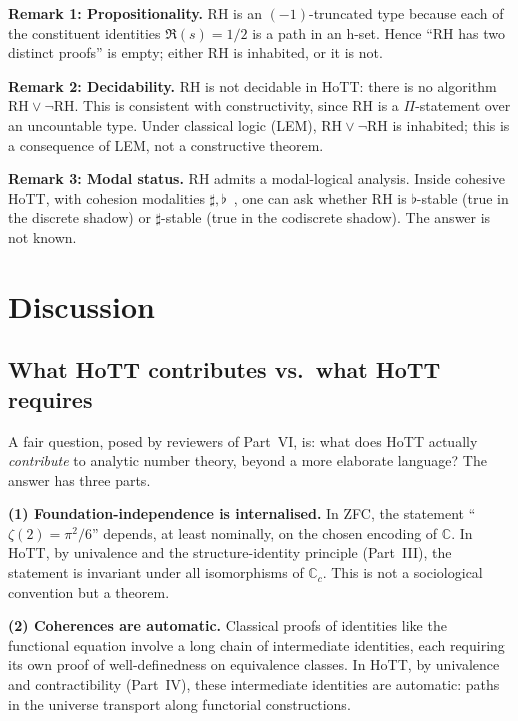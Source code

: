 \documentclass[12pt]{article}
\theoremstyle{definition}
\theoremstyle{remark}
\newcommand{\C}{\mathbb{C}}
\newcommand{\Cc}{\C_{c}}
\begin{document}
\textbf{Remark 1: Propositionality.} $\mathrm{RH}$ is an
$(-1)$-truncated type because each of the constituent identities
$\Re(s) = 1/2$ is a path in an h-set. Hence ``$\mathrm{RH}$ has two
distinct proofs'' is empty; either $\mathrm{RH}$ is inhabited, or it
is not.

\textbf{Remark 2: Decidability.} $\mathrm{RH}$ is not decidable in
HoTT: there is no algorithm $\mathrm{RH} \vee \neg \mathrm{RH}$. This
is consistent with constructivity, since $\mathrm{RH}$ is a
$\Pi$-statement over an uncountable type. Under classical logic
(LEM), $\mathrm{RH} \vee \neg \mathrm{RH}$ is inhabited; this is a
consequence of LEM, not a constructive theorem.

\textbf{Remark 3: Modal status.} $\mathrm{RH}$ admits a modal-logical
analysis. Inside cohesive HoTT, with cohesion modalities $\sharp,
\flat$~\cite{shulman-cohesive}, one can ask whether $\mathrm{RH}$ is
$\flat$-stable (true in the discrete shadow) or $\sharp$-stable
(true in the codiscrete shadow). The answer is not known.

\section{Discussion}\label{sec:discussion}

\subsection{What HoTT contributes vs.\ what HoTT requires}

A fair question, posed by reviewers of Part~VI, is: what does HoTT
actually \emph{contribute} to analytic number theory, beyond a more
elaborate language? The answer has three parts.

\textbf{(1) Foundation-independence is internalised.} In ZFC, the
statement ``$\zeta(2) = \pi^2/6$'' depends, at least nominally, on the
chosen encoding of $\C$. In HoTT, by univalence and the
structure-identity principle (Part~III), the statement is invariant
under all isomorphisms of $\Cc$. This is not a sociological convention
but a theorem.

\textbf{(2) Coherences are automatic.} Classical proofs of identities
like the functional equation involve a long chain of intermediate
identities, each requiring its own proof of well-definedness on
equivalence classes. In HoTT, by univalence and contractibility
(Part~IV), these intermediate identities are automatic: paths in the
universe transport along functorial constructions.
\end{document}
